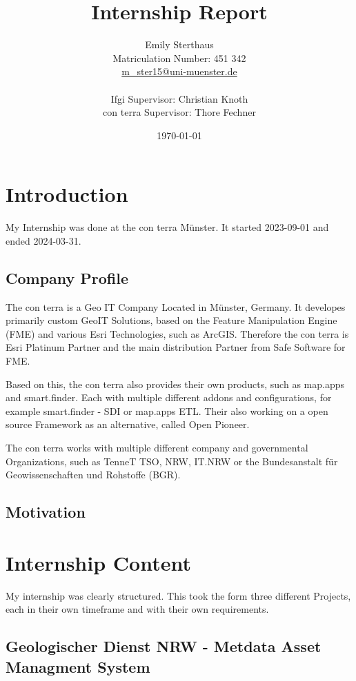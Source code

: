 \documentclass[11pt, titlepage, a4paper]{article}
\title{Internship Report}
\author{Emily Sterthaus \\ Matriculation Number: 451 342 \\ \href{mailto:m_ster15@uni-muenster.de}{m\_ster15@uni-muenster.de}\\ \\
\small Ifgi Supervisor: Christian Knoth\\ \small con terra Supervisor: Thore Fechner
}
\date{\today}
\begin{document}
\maketitle
\newpage
\tableofcontents
\newpage

\section{Introduction}

My Internship was done at the con terra Münster. It started 2023-09-01 and ended 2024-03-31.
\subsection{Company Profile}
The con terra is a Geo IT Company Located in Münster, Germany. It developes primarily custom GeoIT Solutions, based on the Feature Manipulation Engine (FME) and various Esri Technologies, such as ArcGIS. Therefore the con terra is Esri Platinum Partner and the main distribution Partner from Safe Software for FME.

Based on this, the con terra also provides their own products, such as map.apps and smart.finder. Each with multiple different addons and configurations, for example smart.finder - SDI or map.apps ETL. Their also working on a open source Framework as an alternative, called Open Pioneer.   %

The con terra works with multiple different company and governmental Organizations, such as TenneT TSO,   NRW, IT.NRW or the Bundesanstalt für Geowissenschaften und Rohstoffe  (BGR).

\subsection{Motivation}


\section{Internship Content}

My internship was clearly structured. This took the form three different Projects, each in their own timeframe and with their own requirements.

\subsection{Geologischer Dienst NRW - Metdata Asset Managment System}
\end{document}
